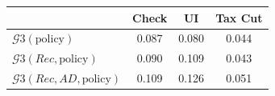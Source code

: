 \begin{tabular}{@{}lccc@{}} 
\toprule 
                          & Check      & UI    & Tax Cut    \\  \midrule 
$\mathcal{G}3(\text{policy})$ & 0.087  & 0.080  & 0.044     \\ 
$\mathcal{G}3(Rec,\text{policy})$ & 0.090  & 0.109  & 0.043     \\ 
$\mathcal{G}3(Rec, AD,\text{policy})$ & 0.109  & 0.126  & 0.051     \\ 
\end{tabular}  
